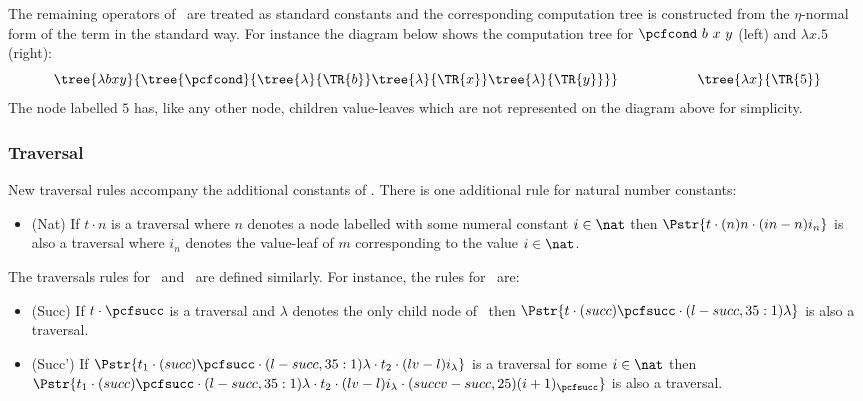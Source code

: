 The remaining operators of \ialgol\ are treated as standard
constants and the corresponding computation tree is constructed from
the $\eta$-normal form of the term in the standard way. For instance
the diagram below shows the computation tree for $\pcfcond\ b\ x\ y$
(left) and $\lambda x . 5$ (right):
$$
\tree{\lambda b x y}
     {  \tree{\pcfcond}
        {   \tree{\lambda} {\TR{b}}
            \tree{\lambda} {\TR{x}}
            \tree{\lambda} {\TR{y}}
        }
    }
\hspace{2cm} \tree{\lambda x}{  \TR{5} }
$$
The node labelled $5$ has, like any other node, children
value-leaves which are not represented on the diagram above for
simplicity.

\subsubsection{Traversal}

New traversal rules accompany the additional constants of \ialgol.
There is one additional rule for natural number constants:
\begin{itemize}
\item (Nat) If $t \cdot n$ is a traversal where $n$ denotes a node labelled with some numeral constant $i\in \nat$ then
            $\Pstr{t \cdot (n){n} \cdot (in-n){i_n}}$
            is also a traversal where $i_n$ denotes the value-leaf of $m$ corresponding to the value $i\in \nat$.
\end{itemize}

\noindent The traversals rules for \pcfpred\ and \pcfsucc\ are
defined similarly. For instance, the rules for \pcfsucc\ are:
\begin{itemize}
\item (Succ) If $t \cdot \pcfsucc$ is a traversal and $\lambda$ denotes the only child node of \pcfsucc\ then
$\Pstr{t \cdot (succ){\pcfsucc} \cdot (l-succ,35:1){\lambda}}$ is also a traversal.

\item (Succ') If
$\Pstr{ t_1 \cdot (succ){\pcfsucc} \cdot (l-succ,35:1){\lambda} \cdot t_2
\cdot (lv-l){i_{\lambda}}} $ is a traversal for some
$i \in \nat$ then $\Pstr{t_1 \cdot (succ){\pcfsucc} \cdot
(l-succ,35:1){\lambda} \cdot t_2 \cdot (lv-l){i_{\lambda}} \cdot
(succv-succ,25){(i+1)_{\pcfsucc}}}$ is also a traversal.
\end{itemize}

